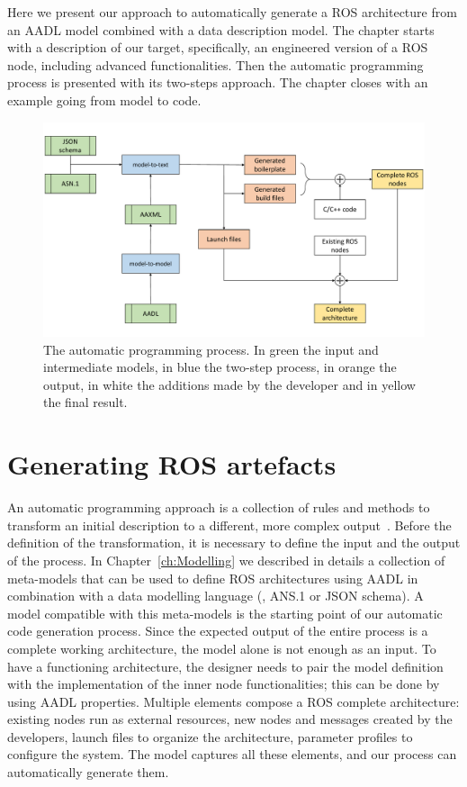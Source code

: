 Here we present our approach to automatically generate a ROS architecture from an AADL model combined with a data description model. The chapter starts with a description of our target, specifically, an engineered version of a ROS node, including advanced functionalities. Then the automatic programming process is presented with its two-steps approach. The chapter closes with an example going from model to code.

\minitoc
\newpage

\begin{figure}[t]
    \centering
    \includegraphics[width=\textwidth]{gfx/code-gen-process}
    \caption[The automatic programming process.]{The automatic programming process. In green the input and intermediate models, in blue the two-step process, in orange the output, in white the additions made by the developer and in yellow the final result.}\label{fig:code-gen}
\end{figure}

\section{Generating ROS artefacts}
An automatic programming approach is a collection of rules and methods to transform an initial description to a different, more complex output~\cite{balzer198515}. Before the definition of the transformation, it is necessary to define the input and the output of the process. In Chapter~\ref{ch:Modelling} we described in details a collection of meta-models that can be used to define ROS architectures using AADL in combination with a data modelling language (\ie, ANS.1 or JSON schema). A model compatible with this meta-models is the starting point of our automatic code generation process. Since the expected output of the entire process is a complete working architecture, the model alone is not enough as an input. To have a functioning architecture, the designer needs to pair the model definition with the implementation of the inner node functionalities; this can be done by using AADL properties. Multiple elements compose a ROS complete architecture: existing nodes run as external resources, new nodes and messages created by the developers, launch files to organize the architecture, parameter profiles to configure the system. The model captures all these elements, and our process can automatically generate them.

